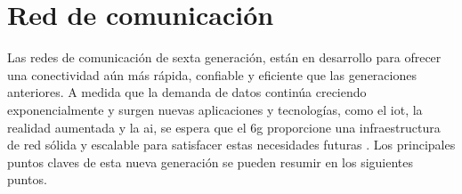 \section{Red de comunicación }
\label{sec:6g}

Las redes de comunicación de sexta generación, están en desarrollo para ofrecer una conectividad aún más rápida, confiable y eficiente que las generaciones anteriores. A medida que la demanda de datos continúa creciendo exponencialmente y surgen nuevas aplicaciones y tecnologías, como el \gls{iot}, la realidad aumentada y la \gls{ai}, se espera que el \gls{6g} proporcione una infraestructura de red sólida y escalable para satisfacer estas necesidades futuras \cite{Nguyen2022}. Los principales puntos claves de esta nueva generación se pueden resumir en los siguientes puntos.

